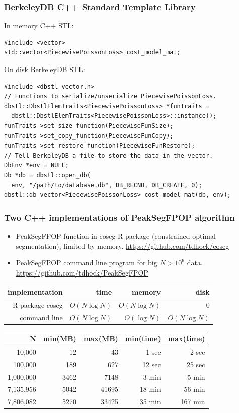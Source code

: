 \documentclass{beamer}
\begin{document}
\begin{frame}[fragile]
  \frametitle{BerkeleyDB C++ Standard Template Library}
In memory C++ STL:
\begin{verbatim}
#include <vector>
std::vector<PiecewisePoissonLoss> cost_model_mat;
\end{verbatim}
On disk BerkeleyDB STL:
\small
\begin{verbatim}
#include <dbstl_vector.h>
// Functions to serialize/unserialize PiecewisePoissonLoss.
dbstl::DbstlElemTraits<PiecewisePoissonLoss> *funTraits =
  dbstl::DbstlElemTraits<PiecewisePoissonLoss>::instance();
funTraits->set_size_function(PiecewiseFunSize);
funTraits->set_copy_function(PiecewiseFunCopy);
funTraits->set_restore_function(PiecewiseFunRestore);
// Tell BerkeleyDB a file to store the data in the vector.
DbEnv *env = NULL;
Db *db = dbstl::open_db(
  env, "/path/to/database.db", DB_RECNO, DB_CREATE, 0);
dbstl::db_vector<PiecewisePoissonLoss> cost_model_mat(db, env);
\end{verbatim}

\end{frame}
\begin{frame}
  \frametitle{Two C++ implementations of PeakSegFPOP algorithm}
  \begin{itemize}
  \item PeakSegFPOP function in coseg R package (constrained optimal
    segmentation), limited by memory. \url{https://github.com/tdhock/coseg}
  \item PeakSegFPOP command line program for big $N > 10^6$ data.
\url{https://github.com/tdhock/PeakSegFPOP}
  \end{itemize}
  \vskip 0.5cm
  \begin{tabular}{rrrr}
    implementation & time & memory & disk \\
    \hline
    R package coseg & $O(N \log N)$ & $O(N \log N)$ & 0 \\
    command line & $O(N \log N)$ & $O(\log N)$ & $O(N\log N)$
  \end{tabular}
  \vskip 0.5cm
  \begin{tabular}{rrrrr}
N&	min(MB)&	max(MB)&	min(time)&	max(time)\\
\hline
10,000&	12&	43&	1 sec&	2 sec\\
100,000&	189&	627&	12 sec&	25 sec\\
1,000,000&	3462&	7148&	3 min&	5 min\\
7,135,956&	5042&	41695&	18 min&	56 min\\
7,806,082&	5270&	33425&	35 min&	167 min
  \end{tabular}
\end{frame}
\end{document}
